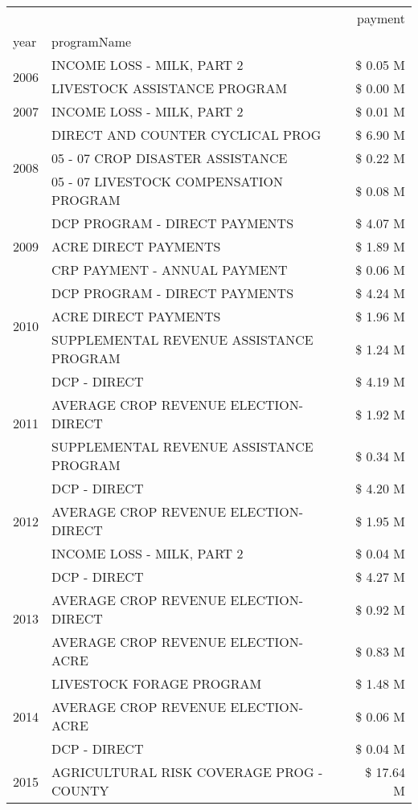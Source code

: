 \begin{tabular}{llr}
\toprule
 &  & payment \\
year & programName &  \\
\midrule
\multirow[t]{2}{*}{2006} & INCOME LOSS - MILK, PART 2 & \$ 0.05 M \\
 & LIVESTOCK ASSISTANCE PROGRAM & \$ 0.00 M \\
\cline{1-3}
2007 & INCOME LOSS - MILK, PART 2 & \$ 0.01 M \\
\cline{1-3}
\multirow[t]{3}{*}{2008} & DIRECT AND COUNTER CYCLICAL PROG & \$ 6.90 M \\
 & 05 - 07 CROP DISASTER ASSISTANCE & \$ 0.22 M \\
 & 05 - 07 LIVESTOCK COMPENSATION PROGRAM & \$ 0.08 M \\
\cline{1-3}
\multirow[t]{3}{*}{2009} & DCP PROGRAM - DIRECT PAYMENTS & \$ 4.07 M \\
 & ACRE DIRECT PAYMENTS & \$ 1.89 M \\
 & CRP PAYMENT - ANNUAL PAYMENT & \$ 0.06 M \\
\cline{1-3}
\multirow[t]{3}{*}{2010} & DCP PROGRAM - DIRECT PAYMENTS & \$ 4.24 M \\
 & ACRE DIRECT PAYMENTS & \$ 1.96 M \\
 & SUPPLEMENTAL REVENUE ASSISTANCE PROGRAM & \$ 1.24 M \\
\cline{1-3}
\multirow[t]{3}{*}{2011} & DCP - DIRECT & \$ 4.19 M \\
 & AVERAGE CROP REVENUE ELECTION-DIRECT & \$ 1.92 M \\
 & SUPPLEMENTAL REVENUE ASSISTANCE PROGRAM & \$ 0.34 M \\
\cline{1-3}
\multirow[t]{3}{*}{2012} & DCP - DIRECT & \$ 4.20 M \\
 & AVERAGE CROP REVENUE ELECTION-DIRECT & \$ 1.95 M \\
 & INCOME LOSS - MILK, PART 2 & \$ 0.04 M \\
\cline{1-3}
\multirow[t]{3}{*}{2013} & DCP - DIRECT & \$ 4.27 M \\
 & AVERAGE CROP REVENUE ELECTION-DIRECT & \$ 0.92 M \\
 & AVERAGE CROP REVENUE ELECTION-ACRE & \$ 0.83 M \\
\cline{1-3}
\multirow[t]{3}{*}{2014} & LIVESTOCK FORAGE PROGRAM & \$ 1.48 M \\
 & AVERAGE CROP REVENUE ELECTION-ACRE & \$ 0.06 M \\
 & DCP - DIRECT & \$ 0.04 M \\
\cline{1-3}
\multirow[t]{3}{*}{2015} & AGRICULTURAL RISK COVERAGE PROG - COUNTY & \$ 17.64 M \\

\end{tabular}
